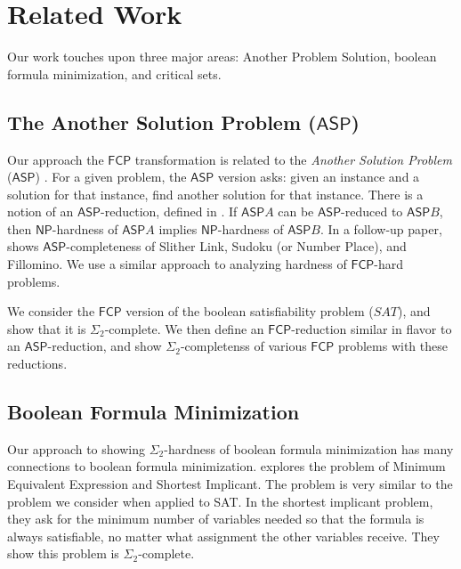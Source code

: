 \documentclass[runningheads,a4paper]{llncs}
\begin{document}
\section{Related Work}
\label{sec:relatedwork}

Our work touches upon three major areas: Another Problem Solution, boolean formula minimization, and critical sets. 

\subsection{The Another Solution Problem ($\mathsf{ASP}$)}

Our approach the $\mathsf{FCP}$ transformation is related to the \emph{Another Solution Problem} ($\mathsf{ASP}$) \cite{Seta01}. For a given problem, the $\mathsf{ASP}$ version asks: given an instance and a solution for that instance, find another solution for that instance. There is a notion of an $\mathsf{ASP}$-reduction, defined in \cite{Seta01}. If $\mathsf{ASP} A$ can be $\mathsf{ASP}$-reduced to $\mathsf{ASP} B$, then $\mathsf{NP}$-hardness of $\mathsf{ASP} A$ implies $\mathsf{NP}$-hardness of $\mathsf{ASP} B$. In a follow-up paper, \cite{takayuki2003complexity} shows $\mathsf{ASP}$-completeness of Slither Link, Sudoku (or Number Place), and Fillomino. We use a similar approach to analyzing hardness of $\mathsf{FCP}$-hard problems. 

We consider the $\mathsf{FCP}$ version of the boolean satisfiability problem ($SAT$), and show that it is $\Sigma_2$-complete. We then define an $\mathsf{FCP}$-reduction similar in flavor to an $\mathsf{ASP}$-reduction, and show $\Sigma_2$-completenss of various $\mathsf{FCP}$ problems with these reductions.

\subsection{Boolean Formula Minimization}

Our approach to showing $\Sigma_2$-hardness of boolean formula minimization has many connections to boolean formula minimization. \cite{umans}\cite{umans2001minimum} explores the problem of Minimum Equivalent Expression and Shortest Implicant. The problem is very similar to the problem we consider when applied to SAT. In the shortest implicant problem, they ask for the minimum number of variables needed so that the formula is always satisfiable, no matter what assignment the other variables receive. They show this problem is $\Sigma_2$-complete.  
\end{document}
